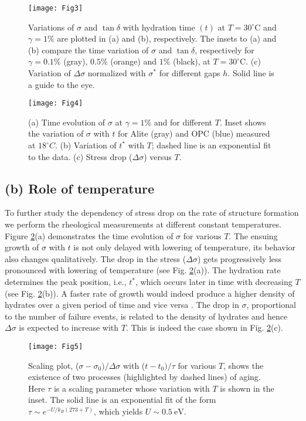\documentclass[final,5p,twocolumn]{elsarticle}
\begin{document}
{	\begin{figure}[t]
		\centering
		\texttt{[image: Fig3]}
		\caption{Variations of $\sigma$  and $\tan\delta$  with hydration time $(t)$ at $T=30 ^{\circ}\mbox{C}$ and $\gamma=1\%$ are plotted in (a) and (b), respectively. The insets to (a) and (b) compare  the time variation of $ \sigma $ and $ \tan \delta $, respectively  for $\gamma=0.1\%$ (gray), $0.5\%$ (orange) and $1\%$ (black), at $T=30 ^{\circ}\mbox{C}$. (c) Variation of $\Delta \sigma$ normalized with $\sigma^{\ast}$  for different gaps $h$. Solid line is a guide to the eye. }
		\label{fig2}
	\end{figure}
	\begin{figure}[t]
		\centering
		\texttt{[image: Fig4]}
		\caption{(a) Time evolution of $\sigma$ at $\gamma=1\%$ and for different $T$. Inset shows the variation of $\sigma$ with $t$ for Alite (gray) and OPC (blue) measured at $18^{\circ}C$. (b) Variation of $t^*$  with $T$;  dashed line is an exponential fit to the data. (c) Stress drop ($\Delta \sigma $) versus $T$.}
		\label{fig3}
	\end{figure}
	\subsection*{(b) Role of temperature}
	To further study the dependency of stress drop on the rate of structure formation we perform the rheological measurements at different constant temperatures. Figure \ref{fig3}(a) demonstrates the time evolution of $\sigma$ for various $T$. The ensuing growth of $\sigma$ with $t$ is not only delayed with lowering of temperature, its behavior also changes qualitatively. The drop in the stress ($ \Delta \sigma $) gets progressively less pronounced with lowering of temperature (see Fig. \ref{fig3}(a)). The  hydration rate  determines the peak position, i.e., $t^{\ast}$,  which occurs later in time with  decreasing $T$ (see Fig. \ref{fig3}(b)). A faster rate of growth would indeed produce a higher density of hydrates over a given period of time and vice versa \cite{gallucci_2013}. The drop in $\sigma$, proportional to the number of failure events, is related to the density of  hydrates and hence $\Delta\sigma$ is expected to increase with $T$. This is indeed the case  shown in Fig. \ref{fig3}(c). 
	
	\begin{figure}[t]
		\centering
		\texttt{[image: Fig5]}
		\caption{Scaling plot, ($\sigma-\sigma_0)/\Delta \sigma$ with ($t-t_0)/\tau$ for various $T$,  shows the existence of  two  processes (highlighted by dashed lines) of aging. Here $\tau$ is a scaling parameter whose variation with $T$ is shown in the inset. The solid line is an exponential fit of the form $\tau\sim e^{-U/k_B(273+T)}$, which yields $U\sim 0.5~\mbox{eV}$.}
		\label{fig4}
	\end{figure}
	
}
\end{document}
